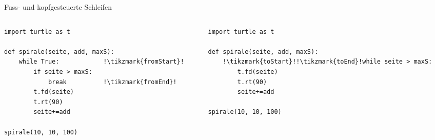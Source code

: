 \begin{frame}[fragile]{Fuss- und kopfgesteuerte Schleifen}
    \begin{columns}
        \begin{column}{.47\textwidth}
            \begin{lstlisting}[escapechar=!,basicstyle=\footnotesize\ttfamily]
import turtle as t

def spirale(seite, add, maxS):
    while True:            !\tikzmark{fromStart}!
    	if seite > maxS:
    	    break          !\tikzmark{fromEnd}!
        t.fd(seite)
        t.rt(90)
        seite+=add

spirale(10, 10, 100)
\end{lstlisting}
        \end{column}
        \begin{column}{.5\textwidth}
            \begin{lstlisting}[escapechar=!,basicstyle=\footnotesize\ttfamily]
import turtle as t

def spirale(seite, add, maxS):
    !\tikzmark{toStart}!!\tikzmark{toEnd}!while seite > maxS:
        t.fd(seite)
        t.rt(90)
        seite+=add
        
spirale(10, 10, 100)
\end{lstlisting}
        \end{column}
    \end{columns}

\end{frame}

